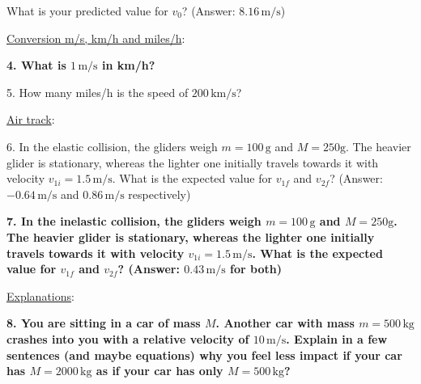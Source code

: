 What is your predicted value for $v_0$? (Answer: $8.16\,\mathrm{m/s}$)\myskip

\noindent\underline{Conversion m/s, km/h and miles/h}: \myskip

{\bf{4. What is $1\, \textrm{m/s}$ in km/h?}}
\myskip

5. How many miles/h is the speed of $200\,\textrm{km/s}$?\myskip


\noindent\underline{Air track}:\myskip

6. In the elastic collision, the gliders weigh $m = 100\,\textrm{g}$ and $M = 250\textrm{g}$. The heavier glider is stationary, whereas the lighter one initially travels towards it with velocity $v_{1i} = 1.5\,\mathrm{m/s}$. What is the expected value for $v_{1f}$ and $v_{2f}$? (Answer: $-0.64\,\mathrm{m/s}$ and $0.86\,\mathrm{m/s}$ respectively)\myskip

{\bf{7. In the inelastic collision, the gliders weigh $m = 100\,\textrm{g}$ and $M = 250\textrm{g}$. The heavier glider is stationary, whereas the lighter one initially travels towards it with velocity $v_{1i} = 1.5\,\mathrm{m/s}$. What is the expected value for $v_{1f}$ and $v_{2f}$? (Answer: $0.43\,\mathrm{m/s}$ for both)}}
\myskip

\noindent\underline{Explanations}:\myskip

{\bf{8. You are sitting in a car of mass $M$. Another car with mass $m = 500\,\textrm{kg}$ crashes into you with a relative velocity of $10\,\textrm{m/s}$. Explain in a few sentences (and maybe equations) why you feel less impact if your car has $M = 2000\,\textrm{kg}$ as if your car has only $M = 500\,\textrm{kg}$? }}
